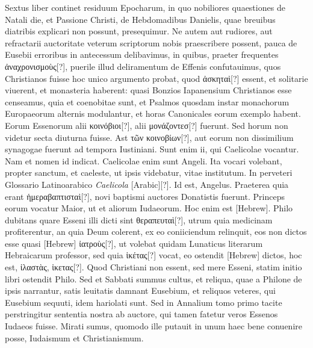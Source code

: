 Sextus liber continet residuum Epocharum,
in quo nobiliores quaestiones de Natali die, et Passione Christi,
de Hebdomadibus Danielis, quae breuibus diatribis explicari
non possunt, presequimur.
Ne autem aut rudiores, aut refractarii auctoritate
veterum scriptorum nobis praescribere possent, pauca de
Eusebii erroribus in antecessum delibavimus, in quibus, praeter frequentes
\textgreek{ἀναχρονισμοὺς[?]}, puerile illud deliramentum
 de Effenis confutauimus,
quos Christianos fuisse hoc unico argumento probat, quod
\textgreek{ἀσκηταὶ[?]} essent, et solitarie viuerent, et monasteria haberent:
quasi Bonzios
Iapanensium Christianos esse censeamus, quia et coenobitae sunt,
et Psalmos quosdam instar monachorum Europaeorum alternis modulantur,
et horas Canonicales eorum exemplo habent.
Eorum Essenorum alii \textgreek{κοινόβιοι[?]}, alii
 \textgreek{μονάζοντεσ[?]} fuerunt.
Sed horum non videtur
secta diuturna fuisse.
Ast \textgreek{τῶν κοινοβίων[?]}, aut eorum non dissimilium
synagogae fuerunt ad tempora Iustiniani.
%
Sunt enim ii, qui Caelicolae
vocantur.
Nam et nomen id indicat.
Caelicolae enim sunt
Angeli.
Ita vocari volebant, propter sanctum, et caeleste, ut ipsis videbatur,
vitae institutum.
In perveteri Glossario Latinoarabico \textit{Caelicola}
\textarabic{}[Arabic][?].
Id est, Angelus.
Praeterea quia erant \textgreek{ἡμεραβαπτισταὶ[?]}, novi
baptismi auctores Donatistis fuerunt.
Princeps eorum vocatur
Maior, ut et aliorum Iudaeorum.
Hoc enim est \texthebrew{}[Hebrew].
Philo dubitans
quare Esseni illi dicti sint \textgreek{θεραπευταὶ[?]},
 utrum quia medicinam profiterentur,
an quia Deum colerent, ex eo coniiciendum relinquit,
eos non dictos esse quasi \texthebrew{}[Hebrew] \textgreek{ἰατροὺς[?]},
 ut volebat quidam Lunaticus
literarum Hebraicarum professor, sed quia \textgreek{ἱκέτας[?]}
 vocat, eo ostendit
\texthebrew{}[Hebrew] dictos, hoc est, \textgreek{ἱλαστὰς, ἱκετας[?]}.
Quod Christiani non essent, sed
mere Esseni, statim initio libri ostendit Philo.
Sed et Sabbati summus
cultus, et reliqua, quae a Philone de ipsis narrantur, satis leuitatis
damnant Eusebium, et reliquos veteres, qui Eusebium sequuti,
idem hariolati sunt.
Sed in Annalium tomo primo tacite perstringitur
sententia nostra ab auctore, qui tamen fatetur veros Essenos Iudaeos
fuisse.
Mirati sumus, quomodo ille putauit in unum haec bene
conuenire posse, Iudaismum et Christianismum.
